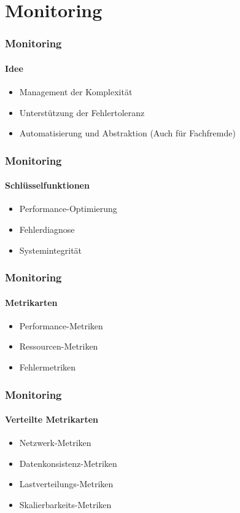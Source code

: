 \section{Monitoring}
\begin{frame}
  \frametitle{Monitoring}
  \framesubtitle{Idee}
  \begin{itemize}
    \item Management der Komplexität
    \item Unterstützung der Fehlertoleranz
    \item Automatisierung und Abstraktion (Auch für Fachfremde)
  \end{itemize}
\end{frame}

\begin{frame}
  \frametitle{Monitoring}
  \framesubtitle{Schlüsselfunktionen}
  \begin{itemize}
    \item Performance-Optimierung
    \item Fehlerdiagnose
    \item Systemintegrität
  \end{itemize}
\end{frame}

\begin{frame}
  \frametitle{Monitoring}
  \framesubtitle{Metrikarten}
  \begin{itemize}
    \item Performance-Metriken
    \item Ressourcen-Metriken
    \item Fehlermetriken
  \end{itemize}
\end{frame}

\begin{frame}
  \frametitle{Monitoring}
  \framesubtitle{Verteilte Metrikarten}
  \begin{itemize}
    \item Netzwerk-Metriken
    \item Datenkonsistenz-Metriken
    \item Lastverteilungs-Metriken
    \item Skalierbarkeits-Metriken
  \end{itemize}
\end{frame}

